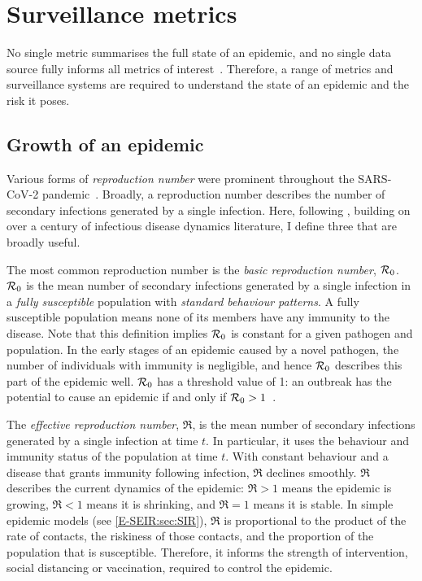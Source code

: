 \documentclass[thesis.tex]{subfiles}
\begin{document}
\section{Surveillance metrics} \label{intro:sec:metrics}

No single metric summarises the full state of an epidemic, and no single data source fully informs all metrics of interest~\autocite{royalSocietyRnumber,pellisEstimation,paragGrowthRates}.
Therefore, a range of metrics and surveillance systems are required to understand the state of an epidemic and the risk it poses.

\subsection{Growth of an epidemic}

Various forms of \emph{reproduction number} were prominent throughout the SARS-CoV-2 pandemic~\autocite{pellisEstimation}.
Broadly, a reproduction number describes the number of secondary infections generated by a single infection.
Here, following \textcite{pellisEstimation},  building on over a century of infectious disease dynamics literature, I define three that are broadly useful.

The most common reproduction number is the \emph{basic reproduction number}, $\mathcal{R}_{0}$.
$\mathcal{R}_{0}$ is the mean number of secondary infections generated by a single infection in a \emph{fully susceptible} population with \emph{standard behaviour patterns}.
A fully susceptible population means none of its members have any immunity to the disease.
Note that this definition implies $\mathcal{R}_{0}$ is constant for a given pathogen and population.
In the early stages of an epidemic caused by a novel pathogen, the number of individuals with immunity is negligible, and hence $\mathcal{R}_{0}$ describes this part of the epidemic well.
$\mathcal{R}_{0}$ has a threshold value of 1: an outbreak has the potential to cause an epidemic if and only if $\mathcal{R}_{0} > 1$~\autocite[76]{diekmannMathematical}.

The \emph{effective reproduction number}, $\Re$, is the mean number of secondary infections generated by a single infection at time $t$.
In particular, it uses the behaviour and immunity status of the population at time $t$.
With constant behaviour and a disease that grants immunity following infection, $\Re$ declines smoothly.
$\Re$ describes the current dynamics of the epidemic: $\Re > 1$ means the epidemic is growing, $\Re < 1$ means it is shrinking, and $\Re = 1$ means it is stable.
In simple epidemic models (see \cref{E-SEIR:sec:SIR}), $\Re$ is proportional to the product of the rate of contacts, the riskiness of those contacts, and the proportion of the population that is susceptible.
Therefore, it informs the strength of intervention, \eg social distancing or vaccination, required to control the epidemic.
\end{document}

